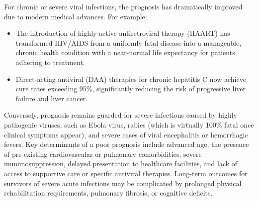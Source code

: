 For chronic or severe viral infections, the prognosis has dramatically improved due to modern medical advances. For example:
\begin{itemize}
    \item The introduction of highly active antiretroviral therapy (HAART) has transformed HIV/AIDS from a uniformly fatal disease into a manageable, chronic health condition with a near-normal life expectancy for patients adhering to treatment.
    \item Direct-acting antiviral (DAA) therapies for chronic hepatitis C now achieve cure rates exceeding 95\%, significantly reducing the risk of progressive liver failure and liver cancer.
\end{itemize}

Conversely, prognosis remains guarded for severe infections caused by highly pathogenic viruses, such as Ebola virus, rabies (which is virtually 100\% fatal once clinical symptoms appear), and severe cases of viral encephalitis or hemorrhagic fevers. Key determinants of a poor prognosis include advanced age, the presence of pre-existing cardiovascular or pulmonary comorbidities, severe immunosuppression, delayed presentation to healthcare facilities, and lack of access to supportive care or specific antiviral therapies. Long-term outcomes for survivors of severe acute infections may be complicated by prolonged physical rehabilitation requirements, pulmonary fibrosis, or cognitive deficits.

